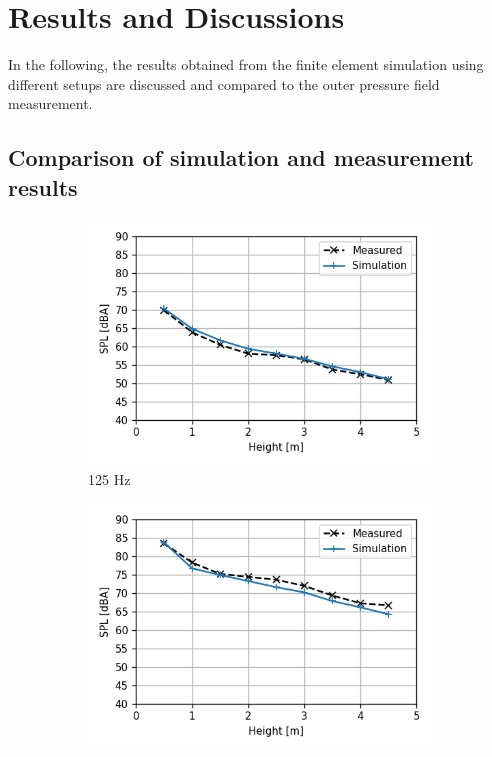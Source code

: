 \chapter{Results and Discussions}
\label{chap:results}

In the following, the results obtained from the finite element simulation using different setups are discussed and compared to the outer pressure field measurement.

\section{Comparison of simulation and measurement results}

\begin{figure}[H]
	\centering
	\begin{subfigure}[b]{0.49\textwidth}
		\centering
		\includegraphics[width=\textwidth]{fig/chap5/initial_model/third_octave_over_height/125_Hz.png}
		\caption{125 Hz}
	\end{subfigure}
	\begin{subfigure}[b]{0.49\textwidth}
		\centering
		\includegraphics[width=\textwidth]{fig/chap5/initial_model/third_octave_over_height/400_Hz.png}

\end{subfigure}
\end{figure}

